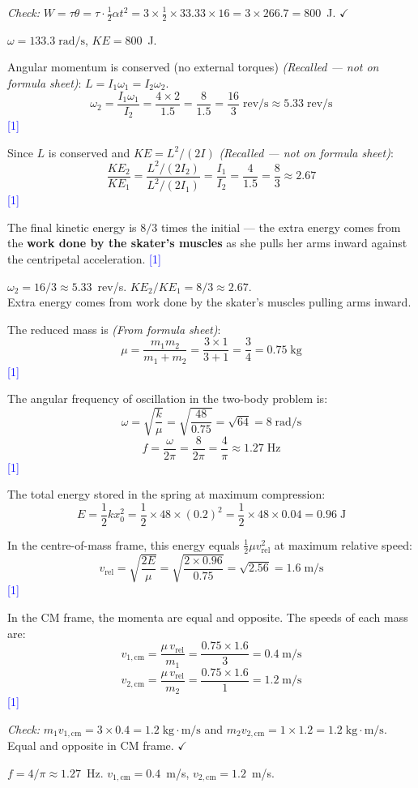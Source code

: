 \documentclass[12pt,a4paper]{article}
\newcommand{\markstep}[1]{\hfill\textcolor{blue}{[#1]}}
\newcommand{\finalanswer}[1]{%
  \begin{tcolorbox}[colback=green!5!white,colframe=green!50!black,boxrule=0.5pt]
  #1
  \end{tcolorbox}
}
\newcommand{\fromsheet}{\textit{(From formula sheet)}}
\newcommand{\recalled}{\textit{(Recalled --- not on formula sheet)}}
\begin{document}
\begin{parts}
\begin{parts}
\textit{Check:} $W = \tau\theta = \tau\cdot\tfrac{1}{2}\alpha t^2 = 3\times\tfrac{1}{2}\times 33.33\times 16 = 3\times 266.7 = 800$~J. $\checkmark$

\finalanswer{$\omega = 133.3\;\text{rad/s}$, \quad $KE = 800$~J.}
\end{parts}

\item Angular momentum is conserved (no external torques) \recalled: $L = I_1\omega_1 = I_2\omega_2$.
\[
\omega_2 = \frac{I_1\omega_1}{I_2} = \frac{4\times 2}{1.5} = \frac{8}{1.5} = \frac{16}{3}\;\text{rev/s} \approx 5.33\;\text{rev/s}
\]
\markstep{1}

Since $L$ is conserved and $KE = L^2/(2I)$ \recalled:
\[
\frac{KE_2}{KE_1} = \frac{L^2/(2I_2)}{L^2/(2I_1)} = \frac{I_1}{I_2} = \frac{4}{1.5} = \frac{8}{3} \approx 2.67
\]
\markstep{1}

The final kinetic energy is $8/3$ times the initial --- the extra energy comes from the \textbf{work done by the skater's muscles} as she pulls her arms inward against the centripetal acceleration. \markstep{1}

\finalanswer{$\omega_2 = 16/3 \approx 5.33$~rev/s. \quad $KE_2/KE_1 = 8/3 \approx 2.67$.\\
Extra energy comes from work done by the skater's muscles pulling arms inward.}

\item The reduced mass is \fromsheet:
\[
\mu = \frac{m_1 m_2}{m_1 + m_2} = \frac{3\times 1}{3 + 1} = \frac{3}{4} = 0.75\;\text{kg}
\]
\markstep{1}

The angular frequency of oscillation in the two-body problem is:
\[
\omega = \sqrt{\frac{k}{\mu}} = \sqrt{\frac{48}{0.75}} = \sqrt{64} = 8\;\text{rad/s}
\]
\[
f = \frac{\omega}{2\pi} = \frac{8}{2\pi} = \frac{4}{\pi} \approx 1.27\;\text{Hz}
\]
\markstep{1}

The total energy stored in the spring at maximum compression:
\[
E = \frac{1}{2}kx_0^2 = \frac{1}{2}\times 48\times(0.2)^2 = \frac{1}{2}\times 48\times 0.04 = 0.96\;\text{J}
\]

In the centre-of-mass frame, this energy equals $\tfrac{1}{2}\mu v_{\text{rel}}^2$ at maximum relative speed:
\[
v_{\text{rel}} = \sqrt{\frac{2E}{\mu}} = \sqrt{\frac{2\times 0.96}{0.75}} = \sqrt{2.56} = 1.6\;\text{m/s}
\]
\markstep{1}

In the CM frame, the momenta are equal and opposite. The speeds of each mass are:
\[
v_{1,\text{cm}} = \frac{\mu\, v_{\text{rel}}}{m_1} = \frac{0.75\times 1.6}{3} = 0.4\;\text{m/s}
\]
\[
v_{2,\text{cm}} = \frac{\mu\, v_{\text{rel}}}{m_2} = \frac{0.75\times 1.6}{1} = 1.2\;\text{m/s}
\]
\markstep{1}

\textit{Check:} $m_1 v_{1,\text{cm}} = 3\times 0.4 = 1.2\;\text{kg}\cdot\text{m/s}$ and $m_2 v_{2,\text{cm}} = 1\times 1.2 = 1.2\;\text{kg}\cdot\text{m/s}$. Equal and opposite in CM frame. $\checkmark$

\finalanswer{$f = 4/\pi \approx 1.27$~Hz. \quad $v_{1,\text{cm}} = 0.4$~m/s, \quad $v_{2,\text{cm}} = 1.2$~m/s.}
\end{parts}
\end{document}
